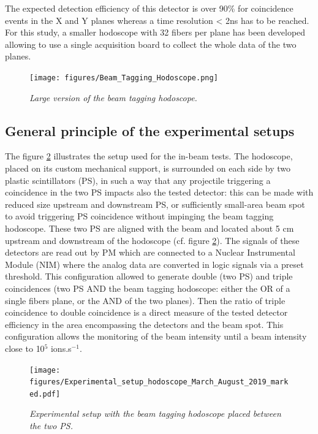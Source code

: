 \documentclass[a4paper,11pt]{article}
\begin{document}
The expected detection efficiency of this detector is over 90\% for coincidence events in the X and Y planes whereas a time resolution < 2ns has to be reached. For this study, a smaller hodoscope with 32 fibers per plane has been developed allowing to use a single acquisition board to collect the whole data of the two planes.

\begin{figure}[H]
\centering
\texttt{[image: figures/Beam\_Tagging\_Hodoscope.png]}
\caption{\small{\textit{Large version of the beam tagging hodoscope.}}}
\label{Hodosocpe}
\end{figure}


\subsection{General principle of the experimental setups}
The figure \ref{fig:Picture_Setup_hodo} illustrates the setup used for the in-beam tests.
The hodoscope, placed on its custom mechanical support, is surrounded on each side by two plastic scintillators (PS), in such a way that any projectile triggering a coincidence in the two PS impacts also the tested detector: this can be made with reduced size upstream and downstream PS, or sufficiently small-area beam spot to avoid triggering PS coincidence without impinging the beam tagging hodoscope. These two PS are aligned with the beam and located about 5 cm upstream and downstream of the hodoscope (cf. figure \ref{fig:Picture_Setup_hodo}). The signals of these detectors are read out by PM which are connected to a Nuclear Instrumental Module (NIM) where the analog data are converted in logic signals via a preset threshold. This configuration allowed to generate double (two PS) and triple coincidences (two PS AND the beam tagging hodoscope: either the OR of a single fibers plane, or the AND of the two planes). Then the ratio of triple coincidence to double coincidence is a direct measure of the tested detector efficiency in the area encompassing the detectors and the beam spot. This configuration allows the monitoring of the beam intensity until a beam intensity close to {10}$^{5}$ ions.s$^{-1}$.

\begin{figure}[H]
\centering
\texttt{[image: figures/Experimental\_setup\_hodoscope\_March\_August\_2019\_marked.pdf]}
\caption{\small{\textit{Experimental setup with the beam tagging hodoscope placed between the two PS.}}}
\label{fig:Picture_Setup_hodo}
\end{figure}
\end{document}
